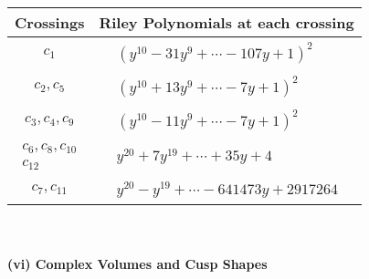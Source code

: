 \documentclass[1p]{elsarticle_modified}
\theoremstyle{definition}
\begin{document}
\begin{tabular}{m{50pt}|m{274pt}}
Crossings & \hspace{64pt}Riley Polynomials at each crossing \\
\hline $$\begin{aligned}c_{1}\end{aligned}$$&$\begin{aligned}
&(y^{10}-31 y^9+\cdots-107 y+1)^{2}
\end{aligned}$\\
\hline $$\begin{aligned}c_{2},c_{5}\end{aligned}$$&$\begin{aligned}
&(y^{10}+13 y^9+\cdots-7 y+1)^{2}
\end{aligned}$\\
\hline $$\begin{aligned}c_{3},c_{4},c_{9}\end{aligned}$$&$\begin{aligned}
&(y^{10}-11 y^9+\cdots-7 y+1)^{2}
\end{aligned}$\\
\hline $$\begin{aligned}c_{6},c_{8},c_{10}\\c_{12}\end{aligned}$$&$\begin{aligned}
&y^{20}+7 y^{19}+\cdots+35 y+4
\end{aligned}$\\
\hline $$\begin{aligned}c_{7},c_{11}\end{aligned}$$&$\begin{aligned}
&y^{20}- y^{19}+\cdots-641473 y+2917264
\end{aligned}$\\
\hline
\end{tabular}\\~\\
\newpage\flushleft \textbf{(vi) Complex Volumes and Cusp Shapes}
\end{document}
